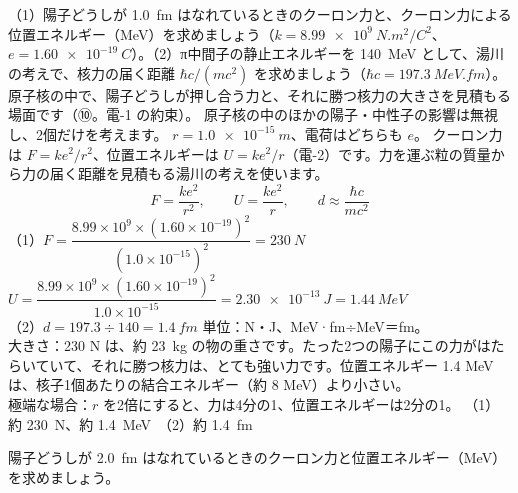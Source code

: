 \label{ph:原-11:ex12}
\begin{phreidai}
（1）陽子どうしが \qty{1.0}{fm} はなれているときのクーロン力と、クーロン力による位置エネルギー（MeV）を求めましょう（$k=\qty{8.99e9}{N.m^2/C^2}$、$e=\qty{1.60e-19}{C}$）。（2）π中間子の静止エネルギーを \qty{140}{MeV} として、湯川の考えで、核力の届く距離 $\hbar c/(mc^2)$ を求めましょう（$\hbar c=\qty{197.3}{MeV.fm}$）。
\phbamen
原子核の中で、陽子どうしが押し合う力と、それに勝つ核力の大きさを見積もる場面です（⑩。電-1 の約束）。
\phmushi
原子核の中のほかの陽子・中性子の影響は無視し、2個だけを考えます。
\phzu
$r=\qty{1.0e-15}{m}$、電荷はどちらも $e$。
\phriyu
クーロン力は $F=ke^2/r^2$、位置エネルギーは $U=ke^2/r$（電-2）です。力を運ぶ粒の質量から力の届く距離を見積もる湯川の考えを使います。
\phtateru
\[ F=\frac{ke^2}{r^2},\qquad U=\frac{ke^2}{r},\qquad d\approx\frac{\hbar c}{mc^2} \]
\phtoku
（1）$F=\dfrac{8.99\times10^9\times(1.60\times10^{-19})^2}{(1.0\times10^{-15})^2}=\qty{230}{N}$\\
$U=\dfrac{8.99\times10^9\times(1.60\times10^{-19})^2}{1.0\times10^{-15}}=\qty{2.30e-13}{J}=\qty{1.44}{MeV}$\\
（2）$d=197.3\div140=\qty{1.4}{fm}$
\phtashikame
単位：N・J、MeV·fm÷MeV＝fm。\\
大きさ：230 N は、約 \qty{23}{kg} の物の重さです。たった2つの陽子にこの力がはたらいていて、それに勝つ核力は、とても強い力です。位置エネルギー 1.4 MeV は、核子1個あたりの結合エネルギー（約 8 MeV）より小さい。\\
極端な場合：$r$ を2倍にすると、力は4分の1、位置エネルギーは2分の1。
\kotae （1）約 \qty{230}{N}、約 \qty{1.4}{MeV}　（2）約 \qty{1.4}{fm}
\end{phreidai}
\begin{jibun}
陽子どうしが \qty{2.0}{fm} はなれているときのクーロン力と位置エネルギー（MeV）を求めましょう。
\end{jibun}

